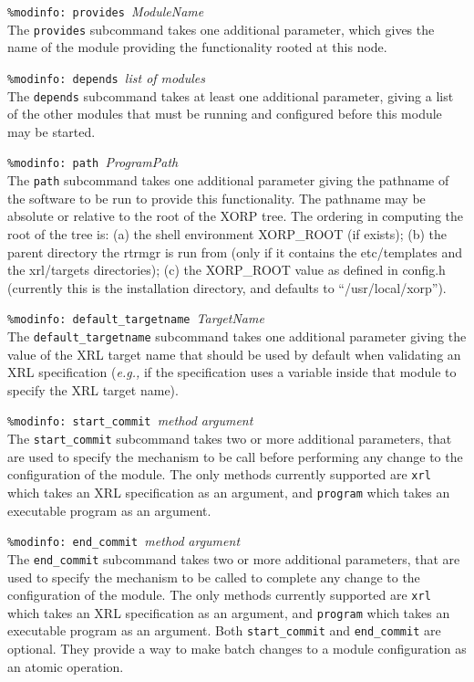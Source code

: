 \documentclass[11pt]{article}
\newcommand{\eg}{\emph{e.g.,}\xspace}
\begin{document}
\begin{description}

  \item {{\tt \%modinfo: provides }{\it ModuleName}} \\
  The {\tt provides} subcommand takes one additional parameter, which gives the
  name of the module providing the functionality rooted at this node.

  \item {{\tt \%modinfo: depends }{\it list of modules}} \\
  The {\tt depends} subcommand takes at least one additional
  parameter, giving a list of the other modules that must
  be running and configured before this module may be started.

  \item {{\tt \%modinfo: path }{\it ProgramPath}} \\
  The {\tt path} subcommand takes one additional parameter giving the pathname
  of the software to be run
  to provide this functionality.  The pathname may be absolute or
  relative to the root of the XORP tree. The ordering in computing the root of
  the tree is: (a) the shell environment XORP\_ROOT (if exists); (b) the parent
  directory the rtrmgr is run from (only if it contains the
  etc/templates and the xrl/targets directories); (c) the XORP\_ROOT value as
  defined in config.h (currently this is the installation directory, and
  defaults to ``/usr/local/xorp'').

  \item {{\tt \%modinfo: default\_targetname }{\it TargetName}} \\
  The {\tt default\_targetname} subcommand takes one additional parameter
  giving the value of the XRL target name that should be used by default when
  validating an XRL specification (\eg if the specification uses a variable
  inside that module to specify the XRL target name).

  \item {{\tt \%modinfo: start\_commit }{\it method }{\it argument}} \\
  The {\tt start\_commit} subcommand takes two or more additional parameters,
  that are used to specify the mechanism to be call before performing any
  change to the configuration of the module. The only methods currently
  supported are {\tt xrl} which takes an XRL specification as an argument, and
  {\tt program} which takes an executable program as an argument.

  \item {{\tt \%modinfo: end\_commit }{\it method }{\it argument}} \\
  The {\tt end\_commit} subcommand takes two or more additional parameters,
  that are used to specify the mechanism to be called to complete any change
  to the configuration of the module. The only methods currently supported are
  {\tt xrl} which takes an XRL specification as an argument, and {\tt program}
  which takes an executable program as an argument.
  Both {\tt start\_commit} and {\tt end\_commit} are optional. They provide a
  way to make batch changes to a module configuration as an atomic operation.


\end{description}
\end{document}
